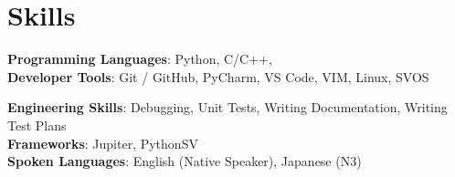 \documentclass[a4paper,11pt]{article}
\makeatletter
\newcommand{\resumeItem}[1]{
  \item\small{
    {#1 \vspace{-2pt}}
  }
}
\newcommand{\resumeSubheading}[4]{
  \vspace{-2pt}\item
    \begin{tabular*}{0.97\textwidth}[t]{l@{\extracolsep{\fill}}r}
      \textbf{#1} & #2 \\
      \textit{\small#3} & \textit{\small #4} \\
    \end{tabular*}\vspace{-7pt}
}
\newcommand{\resumeSubHeadingListStart}{\begin{itemize}[leftmargin=0.15in, label={}]}
\newcommand{\resumeSubHeadingListEnd}{\end{itemize}}
\newcommand{\resumeItemListStart}{\begin{itemize}}
\newcommand{\resumeItemListEnd}{\end{itemize}\vspace{-5pt}}
\makeatother
\begin{document}
\section{Skills}
\begin{itemize}[leftmargin=0.15in, label={}]
	\small{\item{
			\textbf{Programming Languages}{: 
				Python, 
				C/C++,
				} \\
			\textbf{Developer Tools}{: 
				Git / GitHub, 
				PyCharm, 
				VS Code, 
				VIM,
				Linux,
				SVOS
				} \\
			\begin{comment}
			\textbf{Libraries}{: 
				Adafruit Arduino Libraries, 
				Wire, 
				LiquidCrystal
				} \\
			\end{comment}
				\textbf{Engineering Skills}{: 
					Debugging, 
					Unit Tests, 
					Writing Documentation,
					Writing Test Plans
				} \\
				\textbf{Frameworks}{: 
					Jupiter,
					PythonSV
				} \\
			\textbf{Spoken Languages}{: English (Native Speaker), Japanese (N3)}
	}}
\end{itemize}


\begin{comment}
\section{Employment History}
	\resumeSubHeadingListStart
	
		\resumeSubheading
			{System Validation Engineer}{January 2021 -- Present}
			{Intel Corporation}{Hillsboro, OR}
		\resumeItemListStart
			\resumeItem{Post-silicon functional validation of memory controller hardware for Intel Xeon processors}
			\resumeItem{Debug failures and identify areas for improvement in post-silicon test content}
			\resumeItem{Created, defined, and developed system validation environment and test suites}
			\resumeItem{Responsible for validating three features, resulting in the identification of one silicon bug and several BIOS bugs}
	\resumeItemListEnd
\resumeSubHeadingListEnd
\end{comment}
\end{document}
